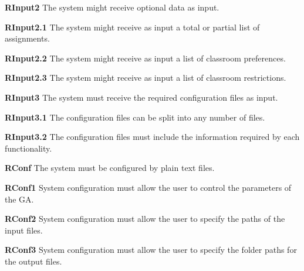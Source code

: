 \begin{description}
    \item \textbf{RInput2} The system might receive optional data as input.
        \begin{description}
            \item \textbf{RInput2.1} The system might receive as input a total or partial list of assignments.
            \item \textbf{RInput2.2} The system might receive as input a list of classroom preferences.
            \item \textbf{RInput2.3} The system might receive as input a list of classroom restrictions.
        \end{description}

    \item \textbf{RInput3} The system must receive the required configuration files as input.
        \begin{description}
            \item \textbf{RInput3.1} The configuration files can be split into any number of files.
            \item \textbf{RInput3.2} The configuration files must include the information required by each functionality.
        \end{description}

    \item \textbf{RConf} The system must be configured by plain text files.
        \begin{description}
            \item \textbf{RConf1} System configuration must allow the user to control the parameters of the GA.
            \item \textbf{RConf2} System configuration must allow the user to specify the paths of the input files.
            \item \textbf{RConf3} System configuration must allow the user to specify the folder paths for the output files.
        \end{description}


\end{description}
